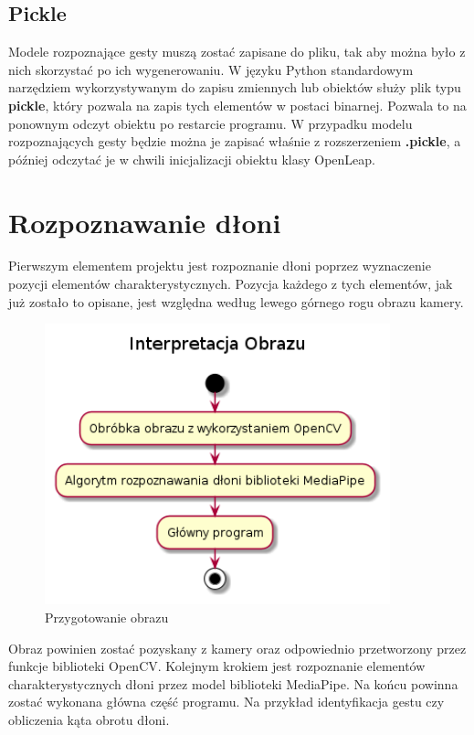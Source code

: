\subsection{Pickle}

\quad Modele rozpoznające gesty muszą zostać zapisane do pliku, tak aby można było z nich skorzystać po ich wygenerowaniu. W języku Python standardowym narzędziem wykorzystywanym do zapisu zmiennych lub obiektów służy plik typu \textbf{pickle}, który pozwala na zapis tych elementów w postaci binarnej. Pozwala to na ponownym odczyt obiektu po restarcie programu. W przypadku modelu rozpoznających gesty będzie można je zapisać właśnie z rozszerzeniem \textbf{.pickle}, a później odczytać je w chwili inicjalizacji obiektu klasy OpenLeap. 

\newpage
\section{Rozpoznawanie dłoni}

\quad Pierwszym elementem projektu jest rozpoznanie dłoni poprzez wyznaczenie pozycji elementów charakterystycznych. Pozycja każdego z tych elementów, jak już zostało to opisane, jest względna według lewego górnego rogu obrazu kamery. 

\begin{figure}[H]
    \begin{center}
        \includegraphics[width=10cm]{../images/image_processing.png}
        \caption{Przygotowanie obrazu}
    \end{center}
\end{figure}

\quad Obraz powinien zostać pozyskany z kamery oraz odpowiednio przetworzony przez funkcje biblioteki OpenCV. Kolejnym krokiem jest rozpoznanie elementów charakterystycznych dłoni przez model biblioteki MediaPipe. Na końcu powinna zostać wykonana główna część programu. Na przykład identyfikacja gestu czy obliczenia kąta obrotu dłoni. 

